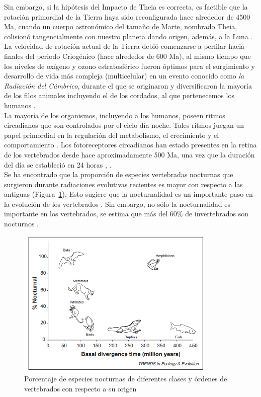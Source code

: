 Sin embargo, si la hipótesis del Impacto de Theia es correcta, es factible que la rotación primordial de la Tierra haya sido reconfigurada hace alrededor de 4500 Ma, cuando un cuerpo astronómico del tamaño de Marte, nombrado Theia, colisionó tangencialmente con nuestro planeta dando origen, además, a la Luna \citep{Stevenson1987}.\\

La velocidad de rotación actual de la Tierra debió comenzarse a perfilar hacia finales del periodo Criogénico (hace alrededor de 600 Ma), al mismo tiempo que los niveles de oxígeno y ozono estratosférico fueron óptimos para el surgimiento y desarrollo de vida más compleja (multicelular) en un evento conocido como \textit{la Radiación del Cámbrico}, durante el que se originaron y diversificaron la mayoría de los filos animales incluyendo el de los cordados, al que pertenecemos los humanos \citep{Conway2000}.\\

La mayoría de los organismos, incluyendo a los humanos, poseen ritmos circadianos que son controlados por el ciclo día-noche. Tales ritmos juegan un papel primordial en la regulación del metabolismo, el crecimiento y el comportamiento \citep{Dunlap1999}. Los fotoreceptores circadianos han estado presentes en la retina de los vertebrados desde hace aproximadamente 500 Ma, una vez que la duración del día se estableció en 24 horas \citep{Conway2000}, \citep{Longcore2006}.\\

Se ha encontrado que la proporción de especies vertebradas nocturnas que surgieron durante radiaciones evolutivas recientes es mayor con respecto a las antiguas (Figura~\ref{nocturnalidad}). Esto sugiere que la nocturnalidad es un importante paso en la evolución de los vertebrados \citep{Holker2010}. Sin embargo, no sólo la nocturnalidad es importante en los vertebrados, se estima que más del 60$\%$ de invertebrados son nocturnos \citep{Longcore2006}.


\begin{figure}[htb]
  \centering
    \includegraphics[width=95mm, scale=0.95]{nocturnalidad}
  \caption{Porcentaje de especies nocturnas de diferentes clases y órdenes de vertebrados con respecto a su origen \citep{Holker2010}}
  \label{nocturnalidad}
\end{figure}

